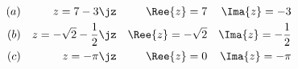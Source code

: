 \begin{align}
  (a) && z=7-3\jz && \Ree{z} = 7 && \Ima{z} = -3
  \\
  (b) && z=-\sqrt{2}-\frac{1}{2} \jz && \Ree{z} = -\sqrt{2} && \Ima{z} =
  -\frac{1}{2}
  \\
  (c) && z=-\pi \jz && \Ree{z} = 0 && \Ima{z} = - \pi
\end{align}
